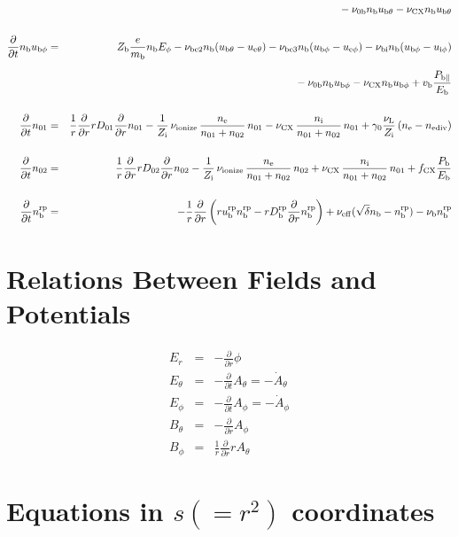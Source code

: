 \documentclass[11pt]{article}
\def\r#1{{\rm#1}}
\def\ddt{\frac{\partial}{\partial t}}
\def\ddr{\frac{\partial}{\partial r}}
\def\mb{m_\r{b}}
\def\ne{n_\r{e}}
\def\ni{n_\r{i}}
\def\nb{n_\r{b}}
\def\ueth{u_{\r{e}\theta}}
\def\ubth{u_{\r{b}\theta}}
\def\ueph{u_{\r{e}\phi}}
\def\uiph{u_{\r{i}\phi}}
\def\ubph{u_{\r{b}\phi}}
\def\Er{E_r}
\def\Eth{E_\theta}
\def\Eph{E_\phi}
\def\Bth{B_\theta}
\def\Bph{B_\phi}
\def\Athd{\dot{A}_\theta}
\def\Aphd{\dot{A}_\phi}
\def\Ath{A_\theta}
\def\Aph{A_\phi}
\def\nna{n_{01}}
\def\nnb{n_{02}}
\def\Zi{Z_\r{i}}
\def\Zb{Z_\r{b}}
\def\Pb{P_\r{b}}
\def\Eb{E_\r{b}}
\def\nbrp{n_\r{b}^\r{rp}}
\def\Pbpara{P_{\r{b}\parallel}}
\def\nueff{\nu_\r{eff}}
\def\ubrp{u_\r{b}^\r{rp}}
\def\Dbrp{D_\r{b}^\r{rp}}
\def\fCX{f_\r{CX}}
\def\nubi{\nu_\r{bi}}
\def\nunb{\nu_\r{0b}}
\def\nuL{\nu_\r{L}}
\def\nuCX{\nu_\r{CX}}
\def\nuion{\nu_\r{ionize}}
\def\nub{\nu_\r{b}}
\def\vb{v_\r{b}}
\def\nediv{n_\r{ediv}}
\begin{document}
\begin{eqnarray}
\nonumber\\[2.5mm]&&{}
%
  - \nunb \nb \ubth
%
  - \nuCX \nb \ubth
\\[5mm]
%
%
  \ddt \nb \ubph &=&
%
  \Zb \frac{e}{\mb} \nb \Eph
%
  - \nu_\r{be2} \nb (\ubth - \ueth)
%
  - \nu_\r{be3} \nb (\ubph - \ueph)
%
  - \nubi \nb (\ubph - \uiph)
\nonumber\\[2.5mm]&&{}
%
  - \nunb \nb \ubph
%
  - \nuCX \nb \ubph
%
  + \vb \frac{\Pbpara}{\Eb}
\\[5mm]
%
%
  \ddt \nna &=& 
%
    \frac{1}{r} \ddr r D_{01} \ddr \nna
%
  - \frac{1}{\Zi}\, \nuion\, \frac{\ne}{\nna+\nnb}\, \nna
%
  - \nuCX\, \frac{\ni}{\nna+\nnb}\, \nna
%
  + \gamma_0 \frac{\nuL}{\Zi} \, (\ne - \nediv)
\\[5mm]
%
%
  \ddt \nnb &=& 
%
    \frac{1}{r} \ddr r D_{02} \ddr \nnb
%
  - \frac{1}{\Zi}\, \nuion\, \frac{\ne}{\nna+\nnb}\, \nnb
%
  + \nuCX\, \frac{\ni}{\nna+\nnb}\, \nna
%
  + \fCX \frac{\Pb}{\Eb}
\\[5mm]
%
%
  \ddt \nbrp &=&
%
  - \frac{1}{r} \ddr \left( r \ubrp \nbrp - r \Dbrp \ddr \nbrp \right)
%
  + \nueff (\sqrt{\delta} \nb - \nbrp)
%
  - \nub \nbrp
%
\end{eqnarray}

\bigskip

\section{Relations Between Fields and Potentials}
\setcounter{equation}{0}

\begin{eqnarray}
%
%
  \Er &=&
%
  - \ddr \phi
\\[5mm]
%
%
  \Eth &=&
%
  - \ddt \Ath = - \Athd
\\[5mm]
%
%
  \Eph &=&
%
  - \ddt \Aph = - \Aphd
\\[5mm]
%
%
  \Bth &=&
%
  - \ddr \Aph
\\[5mm]
%
%
  \Bph &=&
%
  \frac{1}{r} \ddr r \Ath
\end{eqnarray}

\bigskip

\section{Equations in $s(=r^2)$ coordinates}
\setcounter{equation}{0}
\end{document}
